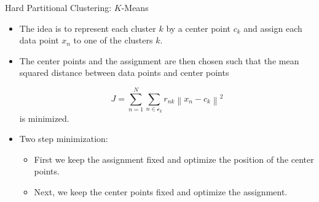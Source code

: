 \documentclass[compress,oilve]{beamer}
\begin{document}

\begin{frame}{Hard Partitional Clustering: $K$-Means}
	\begin{itemize}
		\item The idea is to represent each cluster $k$ by a center point $c_k$ and assign each data point $x_n$ to one of the clusters $k$.
		
		\medskip
		\item The center points and the assignment are then chosen such that the mean squared distance between data points and center points
		
		\begin{equation*}
			J=\sum_{n=1}^N \sum_{n\in\mathcal{c}_k} r_{nk}\left\|x_n-c_k\right\|^2
		\end{equation*}
	is minimized.
	
	\item Two step minimization:
	\begin{itemize}
		\item First we keep the assignment fixed and optimize the position of the center points.
		\item Next, we keep the center points fixed and optimize the
		assignment.
		
	\end{itemize}
	\end{itemize}
\end{frame}
\end{document}
